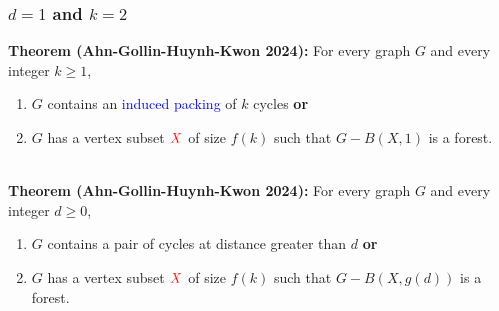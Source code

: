 \documentclass{beamer}
\begin{document}
\begin{frame}
\begin{center}
    \end{center}
\end{frame}

\begin{frame}
  \frametitle{$d=1$ and $k=2$}


  \noindent\textbf{Theorem (Ahn-Gollin-Huynh-Kwon 2024):} For every graph $G$ and every integer $k\ge 1$,
  \begin{enumerate}%
    \item $G$ contains an \textcolor{blue}{induced packing} of $k$ cycles \textbf{or}
    \item $G$ has a vertex subset $\mathcolor{red}{X}$ of size $f(k)$ such that $G-B(X,1)$ is a forest.
  \end{enumerate}
  \ \\[2ex]
  \noindent\textbf{Theorem (Ahn-Gollin-Huynh-Kwon 2024):} For every graph $G$ and every integer $d\ge 0$,
  \begin{enumerate}%
    \item $G$ contains a pair of cycles at distance greater than $d$ \textbf{or}
    \item $G$ has a vertex subset $\mathcolor{red}{X}$ of size $f(k)$ such that $G-B(X,g(d))$ is a forest.
  \end{enumerate}
\end{frame}
\end{document}
